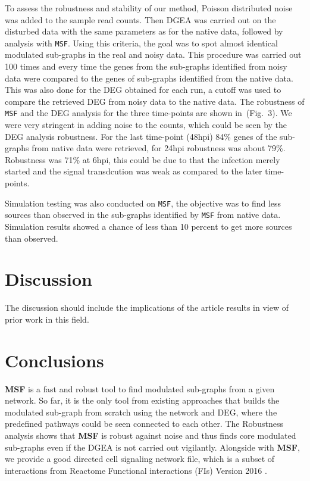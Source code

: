 \documentclass[twocolumn]{article}
\begin{document}
To assess the robustness and stability of our method, Poisson distributed noise was added to the sample read counts. Then DGEA was carried out on the disturbed data with the same parameters as for the native data, followed by analysis with \texttt{MSF}. Using this criteria, the goal was to spot almost
identical modulated sub-graphs in the real and noisy data. This procedure was carried out 100 times and every time the genes from the sub-graphs identified from noisy data were compared to the genes of sub-graphs identified from the native data. This was also done for the DEG obtained for each run, a cutoff was used to compare the retrieved DEG from noisy data to the native data.  The robustness of \texttt{MSF} and the DEG analysis for the three time-points are shown in~(Fig.~3). We were very stringent in adding noise to the counts, which could be seen by the DEG analysis robustness. For the last time-point (48hpi) 84\% genes of the sub-graphs from native data were retrieved, for 24hpi robustness was about 79\%. Robustness was 71\% at 6hpi, this could be due to that the infection merely started and the signal transdcution was weak as compared to the later time-points.

Simulation testing was also conducted on \texttt{MSF}, the objective was to find less sources than observed in the sub-graphs identified by \texttt{MSF} from native data. Simulation results showed a chance of less than 10 percent to get more sources than observed.


\section*{Discussion}

The discussion should include the implications of the article results
in view of prior work in this field.

\section*{Conclusions}

\textbf{MSF} is a fast and robust tool to find modulated sub-graphs from a given network. So far, it is the only tool from existing approaches that builds the modulated sub-graph from scratch using the network and DEG, where the predefined pathways could be seen connected to each other. The Robustness analysis shows that \textbf{MSF} is robust against noise and thus finds core modulated sub-graphs even if the DGEA is not carried out vigilantly. Alongside with \textbf{MSF}, we provide a good directed cell signaling network file, which is a subset of interactions from Reactome Functional interactions (FIs)
Version 2016 .
\end{document}
